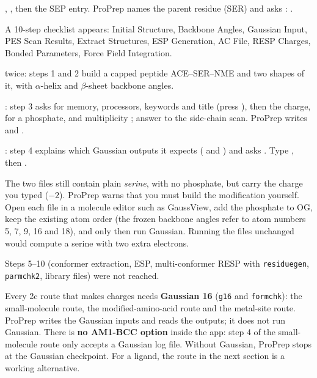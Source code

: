 \begin{steps}
  \item {}, , then the SEP entry. ProPrep names the parent
        residue (SER) and asks :
        .
  \item A 10-step checklist appears: Initial Structure, Backbone Angles,
        Gaussian Input, PES Scan Results, Extract Structures, ESP Generation,
        AC File, RESP Charges, Bonded Parameters, Force Field Integration.
  \item {} twice: steps 1 and 2 build a capped peptide ACE--SER--NME and
        two shapes of it, with $\alpha$-helix and $\beta$-sheet backbone
        angles.
  \item {}: step 3 asks for memory, processors, keywords and title
        (press ), then the charge,  for a phosphate, and
        multiplicity ; answer  to the side-chain scan.
        ProPrep writes  and .
  \item {}: step 4 explains which Gaussian outputs it expects
        ( and ) and asks
        .
        Type , then .
\end{steps}

\begin{watchout}
The two  files still contain plain \emph{serine}, with no
phosphate, but carry the charge you typed ($-2$). ProPrep warns that you must
build the modification yourself. Open each file in a molecule editor such as
GaussView, add the phosphate to OG, keep the existing atom order (the frozen
backbone angles refer to atom numbers 5, 7, 9, 16 and 18), and only then run
Gaussian. Running the files unchanged would compute a serine with two extra
electrons.
\end{watchout}

Steps 5--10 (conformer extraction, ESP, multi-conformer RESP with
\texttt{residuegen}, \texttt{parmchk2}, library files) were not reached.

\begin{needsoftware}
Every 2c route that makes charges needs \textbf{Gaussian 16} (\texttt{g16}
and \texttt{formchk}): the small-molecule route, the modified-amino-acid
route and the metal-site route. ProPrep writes the Gaussian inputs and reads
the outputs; it does not run Gaussian. There is \textbf{no AM1-BCC option}
inside the app: step 4 of the small-molecule route only accepts a Gaussian
log file. Without Gaussian, ProPrep stops at the Gaussian checkpoint. For a
ligand, the route in the next section is a working alternative.
\end{needsoftware}

